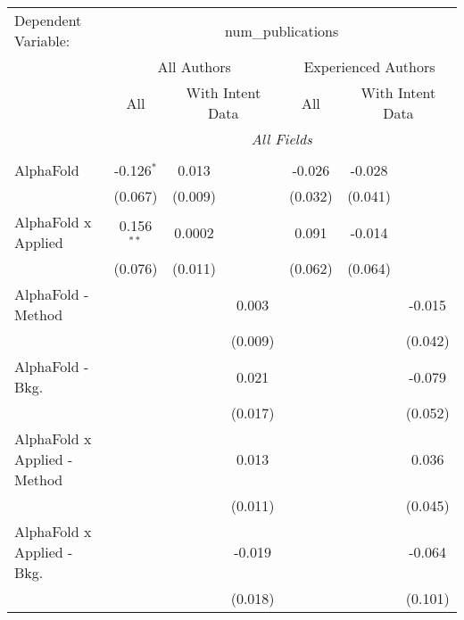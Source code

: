 \begingroup
\centering
\begin{tabular}{lcccccc}
   \tabularnewline \midrule \midrule
   Dependent Variable: & \multicolumn{6}{c}{num\_publications}\\
 & \multicolumn{3}{c}{All Authors} & \multicolumn{3}{c}{Experienced Authors} \\
\cmidrule(lr){2-4} \cmidrule(lr){5-7}
 & \multicolumn{1}{c}{All} & \multicolumn{2}{c}{With Intent Data} & \multicolumn{1}{c}{All} & \multicolumn{2}{c}{With Intent Data} \\
\cmidrule(lr){2-2} \cmidrule(lr){3-4} \cmidrule(lr){5-5} \cmidrule(lr){6-7}
 & \multicolumn{6}{c}{\textit{All Fields}} \\ \\
   AlphaFold                      & -0.126$^{*}$  & 0.013        &              & -0.026        & -0.028  &   \\   
                                  & (0.067)       & (0.009)      &              & (0.032)       & (0.041) &   \\   
   AlphaFold x Applied            & 0.156$^{**}$  & 0.0002       &              & 0.091         & -0.014  &   \\   
                                  & (0.076)       & (0.011)      &              & (0.062)       & (0.064) &   \\   
   AlphaFold - Method             &               &              & 0.003        &               &         & -0.015\\   
                                  &               &              & (0.009)      &               &         & (0.042)\\   
   AlphaFold - Bkg.               &               &              & 0.021        &               &         & -0.079\\   
                                  &               &              & (0.017)      &               &         & (0.052)\\   
   AlphaFold x Applied - Method   &               &              & 0.013        &               &         & 0.036\\   
                                  &               &              & (0.011)      &               &         & (0.045)\\   
   AlphaFold x Applied - Bkg.     &               &              & -0.019       &               &         & -0.064\\   
                                  &               &              & (0.018)      &               &         & (0.101)\\   

\end{tabular}
